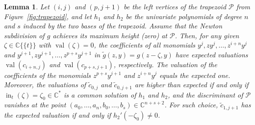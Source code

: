\documentclass[11pt]{amsart}
\numberwithin{equation}{section}
\theoremstyle{plain}
\newtheorem{lemma}[theorem]{Lemma}
\theoremstyle{definition}
\theoremstyle{remark}
\begin{document}
\begin{lemma}\label{lm:expectedHeights} 
  Let $(i,j)$ and $(p,j+1)$ be the left vertices of the trapezoid
  ${\mathcal{P}}$ from Figure~\ref{fig:trapezoid}, and let $h_1$ and $h_2$ be
  the univariate polynomials of degree $n$ and $s$ induced by the two
  bases of the trapezoid. Assume that the Newton subdivision of $g$
  achieves its maximum height (zero) at ${\mathcal{P}}$.  Then, for any given
  ${\zeta}\in {{\mathbb{C}}\{\!\{t
\}\!\}}$ with $\operatorname{val}({\zeta})=0$, the coefficients of all monomials
  $y^j, zy^j, \ldots, z^{i+n}y^j$ and $ y^{j+1}, zy^{j+1}, \ldots,
  z^{p+s}y^{j+1}$ in $\tilde{g}(z,y)=g(z-{\zeta},y)$ have expected
  valuations $\operatorname{val}(c_{i+n,j})$ and $\operatorname{val}(c_{p+s,j+1})$, respectively.
  The valuation of the coefficients of the monomials $z^{p+s}y^{j+1}$
  and $z^{i+n}y^j$ equals the expected one.  Moreover, the valuations
  of $\tilde{c}_{0,j}$ and $\tilde{c}_{0,j+1}$ are higher than
  expected if and only if $\operatorname{in}_t({\zeta})={\zeta}_0\in {\mathbb{C}}^*$ is a common
  solution of $h_1$ and $h_2$, and the discriminant of ${\mathcal{P}}$ vanishes
  at the point $(a_0, \ldots, a_n, b_0,\ldots, b_s)\in
  {\mathbb{C}}^{n+s+2}$. For such choice, $\tilde{c}_{1,j+1}$ has the expected
  valuation if and only if $h_2'(-{\zeta}_0)\neq 0$.
\end{lemma}
\end{document}
